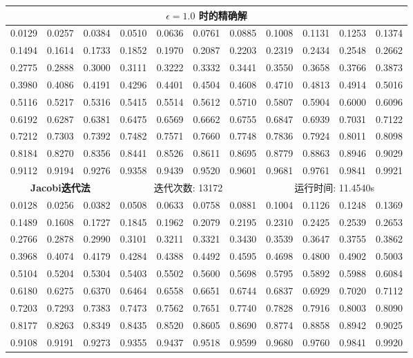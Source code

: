 \documentclass{article}
\begin{document}
\begin{table}[H]
	\centering
	\begin{tabular}{|*{11}{c}|}
		\hline
		\multicolumn{11}{|c|}{\textbf{$\epsilon = 1.0$ 时的精确解}}\\
		\hline
		0.0129 & 0.0257 & 0.0384 & 0.0510 & 0.0636 & 0.0761 & 0.0885 & 0.1008 & 0.1131 & 0.1253 & 0.1374 \\
		0.1494 & 0.1614 & 0.1733 & 0.1852 & 0.1970 & 0.2087 & 0.2203 & 0.2319 & 0.2434 & 0.2548 & 0.2662 \\
		0.2775 & 0.2888 & 0.3000 & 0.3111 & 0.3222 & 0.3332 & 0.3441 & 0.3550 & 0.3658 & 0.3766 & 0.3873 \\
		0.3980 & 0.4086 & 0.4191 & 0.4296 & 0.4401 & 0.4504 & 0.4608 & 0.4710 & 0.4813 & 0.4914 & 0.5016 \\
		0.5116 & 0.5217 & 0.5316 & 0.5415 & 0.5514 & 0.5612 & 0.5710 & 0.5807 & 0.5904 & 0.6000 & 0.6096 \\
		0.6192 & 0.6287 & 0.6381 & 0.6475 & 0.6569 & 0.6662 & 0.6755 & 0.6847 & 0.6939 & 0.7031 & 0.7122 \\
		0.7212 & 0.7303 & 0.7392 & 0.7482 & 0.7571 & 0.7660 & 0.7748 & 0.7836 & 0.7924 & 0.8011 & 0.8098 \\
		0.8184 & 0.8270 & 0.8356 & 0.8441 & 0.8526 & 0.8611 & 0.8695 & 0.8779 & 0.8863 & 0.8946 & 0.9029 \\
		0.9112 & 0.9194 & 0.9276 & 0.9358 & 0.9439 & 0.9520 & 0.9601 & 0.9681 & 0.9761 & 0.9841 & 0.9921 \\
		\hline
		\multicolumn{3}{|c}{\textbf{Jacobi迭代法}} & \multicolumn{4}{|c}{迭代次数: 13172}\ & \multicolumn{4}{|c|}{运行时间: 11.4540s}\\
		\hline
		0.0128 & 0.0256 & 0.0382 & 0.0508 & 0.0633 & 0.0758 & 0.0881 & 0.1004 & 0.1126 & 0.1248 & 0.1369 \\
		0.1489 & 0.1608 & 0.1727 & 0.1845 & 0.1962 & 0.2079 & 0.2195 & 0.2310 & 0.2425 & 0.2539 & 0.2653 \\
		0.2766 & 0.2878 & 0.2990 & 0.3101 & 0.3211 & 0.3321 & 0.3430 & 0.3539 & 0.3647 & 0.3755 & 0.3862 \\
		0.3968 & 0.4074 & 0.4179 & 0.4284 & 0.4388 & 0.4492 & 0.4595 & 0.4698 & 0.4800 & 0.4902 & 0.5003 \\
		0.5104 & 0.5204 & 0.5304 & 0.5403 & 0.5502 & 0.5600 & 0.5698 & 0.5795 & 0.5892 & 0.5988 & 0.6084 \\
		0.6180 & 0.6275 & 0.6370 & 0.6464 & 0.6558 & 0.6651 & 0.6744 & 0.6837 & 0.6929 & 0.7020 & 0.7112 \\
		0.7203 & 0.7293 & 0.7383 & 0.7473 & 0.7562 & 0.7651 & 0.7740 & 0.7828 & 0.7916 & 0.8003 & 0.8090 \\
		0.8177 & 0.8263 & 0.8349 & 0.8435 & 0.8520 & 0.8605 & 0.8690 & 0.8774 & 0.8858 & 0.8942 & 0.9025 \\
		0.9108 & 0.9191 & 0.9273 & 0.9355 & 0.9437 & 0.9518 & 0.9599 & 0.9680 & 0.9760 & 0.9841 & 0.9920 \\
		\hline
		

\end{tabular}
\end{table}
\end{document}
